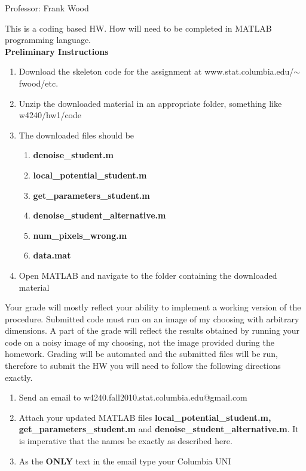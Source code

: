 \documentclass[12pt]{article}
\begin{document}

\begin{center}
	Professor: Frank Wood
\end{center}


This is a coding based HW.  How will need to be completed in MATLAB programming language.\\

{\bf Preliminary Instructions}
\begin{enumerate}
	\item Download the skeleton code for the assignment at www.stat.columbia.edu/$\sim$fwood/etc.
	\item Unzip the downloaded material in an appropriate folder, something like w4240/hw1/code
	\item { The downloaded files should be
		 \begin{enumerate}
			\item {\bf denoise\_student.m}
			\item {\bf local\_potential\_student.m}
			\item {\bf get\_parameters\_student.m}
			\item {\bf denoise\_student\_alternative.m}
			\item{\bf num\_pixels\_wrong.m}
			\item {\bf data.mat}
		\end{enumerate}
	}
	\item Open MATLAB and navigate to the folder containing the downloaded material
\end{enumerate}

Your grade will mostly reflect your ability to implement a working version of the procedure.  Submitted code must run on an image of my choosing with arbitrary dimensions.  A part of the grade will reflect the results obtained by running your code on a noisy image of my choosing, not the image provided during the homework.  Grading will be automated and the submitted files will be run, therefore to submit the HW you will need to follow the following directions exactly.

\begin{enumerate}
	\item Send an email to w4240.fall2010.stat.columbia.edu@gmail.com
	\item Attach your updated MATLAB files {\bf local\_potential\_student.m, get\_parameters\_student.m} and {\bf denoise\_student\_alternative.m}.  It is imperative that the names be exactly as described here.
	\item As the {\bf ONLY} text in the email type your Columbia UNI
\end{enumerate}
\end{document}
